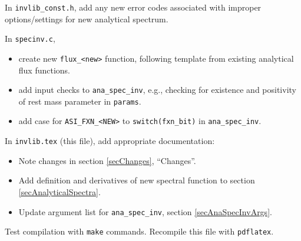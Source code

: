 \documentclass{article}    %
\begin{document}
In \verb|invlib_const.h|, add any new error codes associated with
improper options/settings for new analytical spectrum.

In \verb|specinv.c|, 
\begin{itemize}
\item create new \verb|flux_<new>| function, following template from existing analytical flux functions.
\item add input checks to \verb|ana_spec_inv|, e.g., checking for existence and positivity of rest mass parameter in \verb|params|.
\item add case for \verb|ASI_FXN_<NEW>| to \verb|switch(fxn_bit)| in \verb|ana_spec_inv|.
\end{itemize}

In \verb|invlib.tex| (this file), add appropriate documentation:
\begin{itemize}
\item Note changes in section \ref{secChanges}, ``Changes''.
\item Add definition and derivatives of new spectral function to section \ref{secAnalyticalSpectra}.
\item Update argument list for \verb|ana_spec_inv|, section \ref{secAnaSpecInvArgs}.
\end{itemize}

Test compilation with \verb|make| commands. Recompile this file with \verb|pdflatex|.
\end{document}
